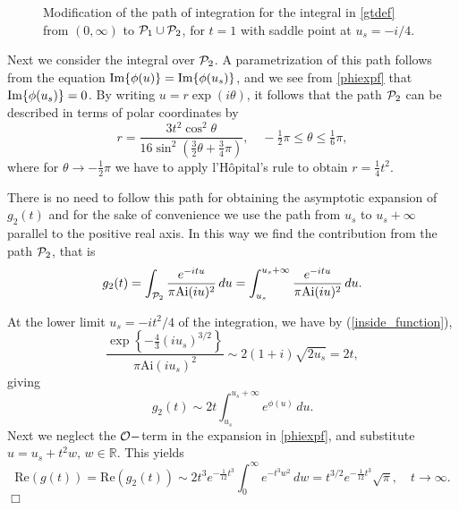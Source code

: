 \documentclass[11pt]{article}
\begin{document}
\begin{figure}
\begin{center}
\epsfxsize=12cm 
\caption{Modification of the path of integration for the integral in \eqref{gtdef} from $(0,\infty)$ to ${{\cal P}}_1\cup{{\cal P}}_2$, for $t=1$ with saddle point at $u_s=-i/4$. \label{fig1}
}
\end{center}
\end{figure}

Next we consider the integral over ${{\cal P}}_2$. A parametrization of this path follows from the equation 
$\mbox{\rm Im}\{\phi(u)\}= \mbox{\rm Im}\{\phi(u_s)\}$, and we see from \eqref{phiexpf} that  $\mbox{\rm Im}\{\phi(u_s)\}=0$.  By writing $u=r\exp(i\theta)$, it follows that the path ${{\cal P}}_2$ can be described in terms of polar coordinates by 
$$
r= \frac{3t^2\cos^2\theta}{16\sin^2\left(\frac32\theta+\frac34\pi\right)},\quad -\tfrac12\pi\le \theta\le \tfrac16\pi,
$$
where for $\theta\to-\frac12\pi$ we have to apply l'H\^opital's rule to obtain $r=\frac14t^2$.

There is no need to follow this path for obtaining the asymptotic expansion of $g_2(t)$ and for the sake of convenience we use the path from $u_s$ to $u_s+\infty$ parallel to the positive real axis.  In this way we find the contribution from the path ${{\cal P}}_2$, that is
\begin{equation}\label{defg2}
g_2(t)=\int_{{{\cal P}}_2}\frac{e^{-itu}}{\pi{\mbox{Ai}}(iu)^2}\,du=\int_{u_s} ^{u_s+\infty}\frac{e^{-itu}}{\pi{\mbox{Ai}}(iu)^2}\,du.
\end{equation}

At the lower limit $u_s=-it^2/4$ of the integration, we have by (\ref{inside_function}),
$$
\frac{\exp\left\{-\tfrac43(iu_s)^{3/2}\right\}}{\pi{\mbox{Ai}}(iu_s)^2}\sim 2(1+i)\sqrt{2u_s}=2t,
$$
giving
$$
g_2(t)\sim2t\int_{u_s} ^{u_s+\infty}e^{\phi(u)}\,du.
$$
Next we neglect the ${{\cal O}}-$term in the expansion in \eqref{phiexpf}, and substitute
$u=u_s+t^2w,\,w\in{\mathbb R}$. This yields
\begin{equation}
\label{Regtasymp}
\mbox{Re}(g(t))=\mbox{Re}(g_2(t))\sim 2t^3e^{-\frac1{12}t^3}\int_0^{\infty}e^{-t^3w^2}\,dw=t^{3/2}e^{-\frac1{12}t^3}\sqrt{\pi}, \quad t\to\infty.
\end{equation}
{\hfill\mbox{$\Box$}\newline}
\end{document}
